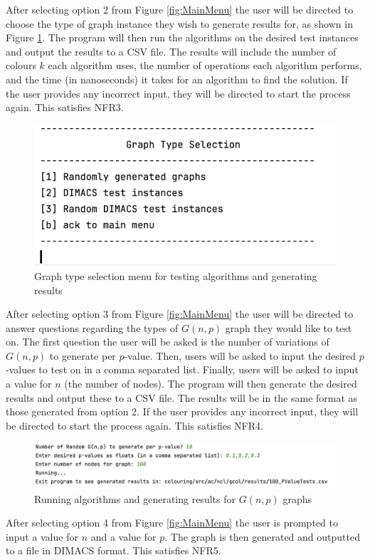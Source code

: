 After selecting option 2 from Figure \ref{fig:MainMenu} the user will be directed to choose the type of graph instance they wish to generate results for, as shown in Figure \ref{fig:GtypeSelect}. The program will then run the algorithms on the desired test instances and output the results to a CSV file. The results will include the number of colours $k$ each algorithm uses, the number of operations each algorithm performs, and the time (in nanoseconds) it takes for an algorithm to find the solution. If the user provides any incorrect input, they will be directed to start the process again. This satisfies NFR3. 
\begin{figure}[H]
    \centering
    \includegraphics[width=0.5\linewidth]{Components/GraphTestSelection.png}
    \caption{Graph type selection menu for testing algorithms and generating results}
    \label{fig:GtypeSelect}
\end{figure}
After selecting option 3 from Figure \ref{fig:MainMenu} the user will be directed to answer questions regarding the types of $G(n, p)$ graph they would like to test on. The first question the user will be asked is the number of variations of $G(n, p)$ to generate per $p$-value. Then, users will be asked to input the desired $p$-values to test on in a comma separated list. Finally, users will be asked to input a value for $n$ (the number of nodes). The program will then generate the desired results and output these to a CSV file. The results will be in the same format as those generated from option 2. If the user provides any incorrect input, they will be directed to start the process again. This satisfies NFR4.
\begin{figure}[H]
    \centering
    \includegraphics[width=0.7\linewidth]{Components/RunningTests.png}
    \caption{Running algorithms and generating results for $G(n, p)$ graphs}
    \label{fig:enter-label}
\end{figure}
After selecting option 4 from Figure \ref{fig:MainMenu} the user is prompted to input a value for $n$ and a value for $p$. The graph is then generated and outputted to a file in DIMACS format. This satisfies NFR5.

